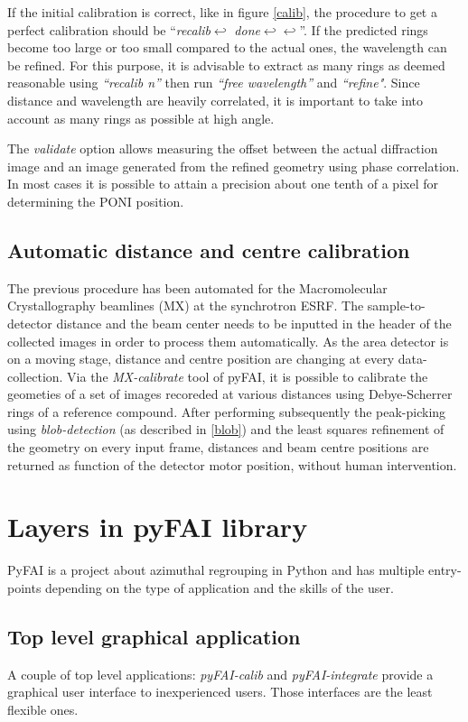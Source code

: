 \documentclass{iucr}
\begin{document}
If the initial calibration is correct, like in figure \ref{calib}, the procedure
to get a perfect calibration should be ``\textit{recalib}$\hookleftarrow $
\textit{done}$\hookleftarrow \hookleftarrow $''.
If the predicted rings become too large or too small compared
to the actual ones, the wavelength can be refined.
For this purpose, it is advisable to  extract as many rings as
deemed reasonable using \textit{``recalib n''} then run \textit{``free wavelength''} and
\textit{``refine"}.%
Since distance and wavelength are
heavily correlated, it is important to take into account as many rings as
possible at high angle.

The \textit{validate} option allows measuring the offset between the actual
diffraction image and an image generated from the refined geometry using phase
correlation.
In most cases it is possible to attain a precision about one tenth of a pixel
for determining the PONI position.

\subsection{Automatic distance and centre calibration}
The previous procedure has been automated for the  Macromolecular
Crystallography beamlines (MX) at the synchrotron ESRF.
The sample-to-detector distance and the beam center needs to be inputted in the
header of the collected images in order to process them automatically.
As the area detector is on a moving stage, distance and centre position are
changing at every data-collection.
Via the \textit{MX-calibrate} tool of pyFAI, it is possible to calibrate the
geometies of a set of images recoreded at various distances using Debye-Scherrer
rings of a reference compound.
After performing subsequently the peak-picking using \textit{blob-detection}
(as described in \ref{blob}) and the least squares refinement of the geometry on
every input frame, distances and beam centre positions are returned as function
of the detector motor position, without human intervention.

\section{Layers in pyFAI library}
PyFAI is a project about azimuthal regrouping in Python and has multiple
entry-points depending on the type of application and the skills of the user.

\subsection{Top level graphical application}
A couple of top level applications: \textit{pyFAI-calib} and
\textit{pyFAI-integrate} provide a graphical user interface to inexperienced
users. Those interfaces are the least flexible ones.
\end{document}
